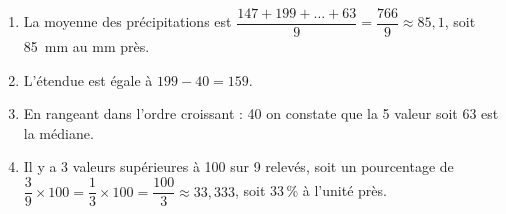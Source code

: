 
\medskip

%
%

\medskip

\begin{enumerate}
\item %
La moyenne des précipitations est $\dfrac{147 + 199 + \ldots + 63}{9} = \dfrac{766}{9} \approx 85,1$, soit 85~mm au mm près.
\item %
L'étendue est égale à $199 - 40 = 159$.
\item %
En rangeant dans l'ordre croissant : 40         on constate que la 5 valeur soit 63 est la médiane.
\item %
Il y a 3 valeurs supérieures à 100 sur 9 relevés, soit un pourcentage de $\dfrac{3}{9} \times 100 = \dfrac13 \times 100 = \dfrac{100}{3} \approx 33,333$, soit 33\,\% à l'unité près.
\end{enumerate}

\bigskip

